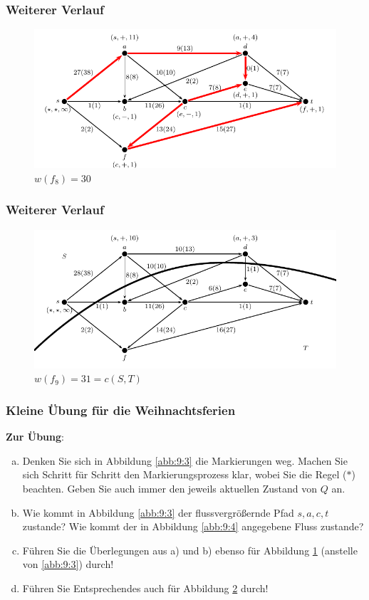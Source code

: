 \documentclass[smaller]{beamer}
\begin{document}
\begin{frame}
 \frametitle{Weiterer Verlauf}
 \begin{center}
  \begin{figure}
   \includegraphics{fig31.pdf}
   \caption{$w(f_8) = 30$}
   \label{abb:9:10}
  \end{figure}
\end{center}
\end{frame}

\begin{frame}
 \frametitle{Weiterer Verlauf}
 \begin{center}
  \begin{figure}
   \includegraphics{fig32.pdf}
   \caption{$w(f_9) = 31 = c(S,T)$}
   \label{abb:9:11}
  \end{figure}
\end{center}
\end{frame}

\begin{frame}
\frametitle{Kleine Übung für die Weihnachtsferien}
\textbf{Zur Übung}:
\begin{enumerate}[a)]
\item Denken Sie sich in Abbildung \ref{abb:9:3} die Markierungen weg. Machen Sie sich Schritt für Schritt den Markierungsprozess klar, wobei Sie die Regel ($*$) beachten. Geben Sie auch immer den jeweils aktuellen Zustand von $Q$ an.
\item Wie kommt in Abbildung \ref{abb:9:3} der flussvergrößernde Pfad $s,a,c,t$ zustande? Wie kommt der in Abbildung \ref{abb:9:4} angegebene Fluss zustande?
\item Führen Sie die Überlegungen aus a) und b) ebenso für Abbildung \ref{abb:9:10} (anstelle von \ref{abb:9:3}) durch!
\item Führen Sie Entsprechendes auch für Abbildung \ref{abb:9:11} durch!
\end{enumerate}
\end{frame}
\end{document}

